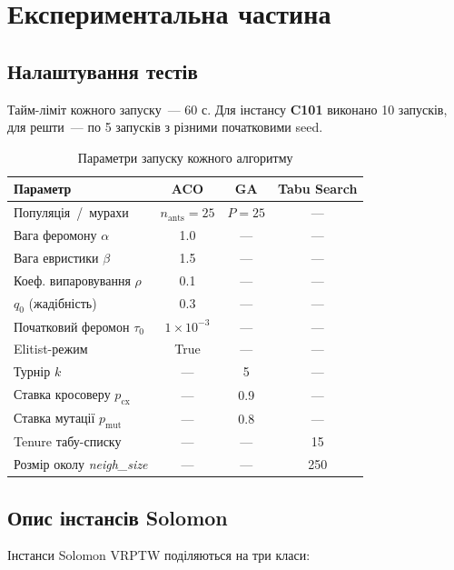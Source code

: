 \documentclass[12pt,a4paper]{article}
\begin{document}
\section{Експериментальна частина}
\subsection{Налаштування тестів}
Тайм-ліміт кожного запуску~— 60 с.  
Для інстансу \textbf{C101} виконано 10 запусків,  
для решти~— по 5 запусків з різними початковими seed.

\vspace{0.5em}
\begin{table}[ht]
\centering
\caption{Параметри запуску кожного алгоритму}
\label{tab:setup}
\begin{tabular}{@{}lccc@{}}
\toprule
\textbf{Параметр} & \textbf{ACO} & \textbf{GA} & \textbf{Tabu Search}\\
\midrule
Популяція \,/\, мурахи            & $n_{\text{ants}} = 25$ & $P = 25$ & --- \\
Вага феромону $\alpha$            & 1.0 & --- & --- \\
Вага евристики $\beta$            & 1.5 & --- & --- \\
Коеф. випаровування $\rho$        & 0.1 & --- & --- \\
$ q_0 $ (жадібність)              & 0.3 & --- & --- \\
Початковий феромон $\tau_0$       & $1\times10^{-3}$ & --- & --- \\
Elitist-режим                     & True & --- & --- \\
\addlinespace
Турнір $k$                        & --- & 5  & --- \\
Ставка кросоверу $p_\text{cx}$    & --- & 0.9 & --- \\
Ставка мутації  $p_\text{mut}$    & --- & 0.8 & --- \\
\addlinespace
Tenure табу-списку                & --- & --- & 15 \\
Розмір околу \textit{neigh\_size} & --- & --- & 250 \\
\bottomrule
\end{tabular}
\end{table}

\subsection{Опис інстансів Solomon}

Інстанси Solomon VRPTW поділяються на три класи:
\end{document}
